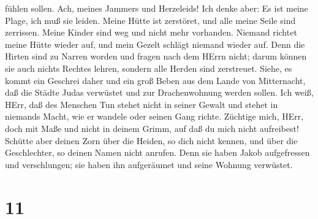 fühlen sollen.  Ach, meines Jammers und Herzeleids! Ich
denke aber: Es ist meine Plage, ich muß sie leiden.  Meine
Hütte ist zerstöret, und alle meine Seile sind zerrissen. Meine Kinder
sind weg und nicht mehr vorhanden. Niemand richtet meine Hütte wieder
auf, und mein Gezelt schlägt niemand wieder auf.  Denn die
Hirten sind zu Narren worden und fragen nach dem HErrn nicht; darum
können sie auch nichts Rechtes lehren, sondern alle Herden sind
zerstreuet.  Siehe, es kommt ein Geschrei daher und ein
groß Beben aus dem Lande von Mitternacht, daß die Städte Judas verwüstet
und zur Drachenwohnung werden sollen.  Ich weiß, HErr, daß
des Menschen Tun stehet nicht in seiner Gewalt und stehet in niemands
Macht, wie er wandele oder seinen Gang richte.  Züchtige
mich, HErr, doch mit Maße und nicht in deinem Grimm, auf daß du mich
nicht aufreibest!  Schütte aber deinen Zorn über die
Heiden, so dich nicht kennen, und über die Geschlechter, so deinen Namen
nicht anrufen. Denn sie haben Jakob aufgefressen und verschlungen; sie
haben ihn aufgeräumet und seine Wohnung verwüstet.

\hypertarget{section-10}{%
\section{11}\label{section-10}}

